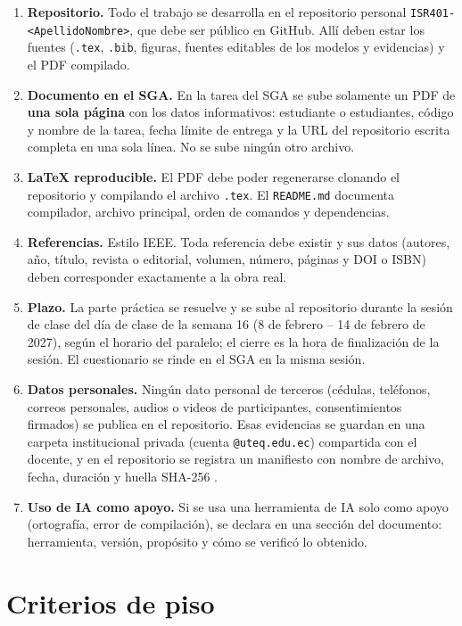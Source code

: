 \documentclass[11pt]{article}
\newcommand{\seccion}[1]{\section{\textcolor{utegreendk}{#1}}}
\begin{document}
\begin{enumerate}[leftmargin=20pt,itemsep=3pt]
	\item \textbf{Repositorio.} Todo el trabajo se desarrolla en el repositorio personal \texttt{ISR401-<ApellidoNombre>}, que debe ser público en GitHub. Allí deben estar los fuentes (\texttt{.tex}, \texttt{.bib}, figuras, fuentes editables de los modelos y evidencias) y el PDF compilado.
	\item \textbf{Documento en el SGA.} En la tarea del SGA se sube solamente un PDF de \textbf{una sola página} con los datos informativos: estudiante o estudiantes, código y nombre de la tarea, fecha límite de entrega y la URL del repositorio escrita completa en una sola línea. No se sube ningún otro archivo.
	\item \textbf{\LaTeX{} reproducible.} El PDF debe poder regenerarse clonando el repositorio y compilando el archivo \texttt{.tex}. El \texttt{README.md} documenta compilador, archivo principal, orden de comandos y dependencias.
	\item \textbf{Referencias.} Estilo IEEE. Toda referencia debe existir y sus datos (autores, año, título, revista o editorial, volumen, número, páginas y DOI o ISBN) deben corresponder exactamente a la obra real.
	\item \textbf{Plazo.} La parte práctica se resuelve y se sube al repositorio durante la sesión de clase del día de clase de la semana 16 (8 de febrero -- 14 de febrero de 2027), según el horario del paralelo; el cierre es la hora de finalización de la sesión. El cuestionario se rinde en el SGA en la misma sesión.
	\item \textbf{Datos personales.} Ningún dato personal de terceros (cédulas, teléfonos, correos personales, audios o videos de participantes, consentimientos firmados) se publica en el repositorio. Esas evidencias se guardan en una carpeta institucional privada (cuenta \texttt{@uteq.edu.ec}) compartida con el docente, y en el repositorio se registra un manifiesto con nombre de archivo, fecha, duración y huella SHA-256 \citep{lopdp_2021}.
	\item \textbf{Uso de IA como apoyo.} Si se usa una herramienta de IA solo como apoyo (ortografía, error de compilación), se declara en una sección del documento: herramienta, versión, propósito y cómo se verificó lo obtenido.
\end{enumerate}

\seccion{Criterios de piso}
\end{document}
